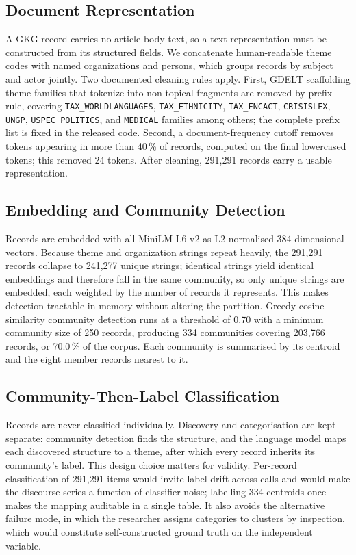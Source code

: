 \documentclass[conference]{IEEEtran}
\begin{document}
\subsection{Document Representation}
A GKG record carries no article body text, so a text representation must be
constructed from its structured fields. We concatenate human-readable theme
codes with named organizations and persons, which groups records by subject
and actor jointly. Two documented cleaning rules apply. First, GDELT
scaffolding theme families that tokenize into non-topical fragments are removed
by prefix rule, covering \texttt{TAX\_WORLDLANGUAGES}, \texttt{TAX\_ETHNICITY},
\texttt{TAX\_FNCACT}, \texttt{CRISISLEX}, \texttt{UNGP},
\texttt{USPEC\_POLITICS}, and \texttt{MEDICAL} families among others; the
complete prefix list is fixed in the released code.
Second, a document-frequency cutoff removes tokens appearing in more than
40\,\% of records, computed on the final lowercased tokens; this removed 24
tokens. After cleaning, 291{,}291 records carry a usable representation.

\subsection{Embedding and Community Detection}
Records are embedded with all-MiniLM-L6-v2 \cite{reimers2019} as L2-normalised
384-dimensional vectors. Because theme and organization strings repeat heavily,
the 291{,}291 records collapse to 241{,}277 unique strings; identical strings
yield identical embeddings and therefore fall in the same community, so only
unique strings are embedded, each weighted by the number of records it
represents. This makes detection tractable in memory without altering the
partition. Greedy cosine-similarity community detection runs at a threshold of
0.70 with a minimum community size of 250 records, producing 334 communities
covering 203{,}766 records, or 70.0\,\% of the corpus. Each community is
summarised by its centroid and the eight member records nearest to it.

\subsection{Community-Then-Label Classification}
Records are never classified individually. Discovery and categorisation are kept
separate: community detection finds the structure, and the language model maps
each discovered structure to a theme, after which every record inherits its
community's label. This design choice matters for validity. Per-record
classification of 291{,}291 items would invite label drift across calls and
would make the discourse series a function of classifier noise; labelling 334
centroids once makes the mapping auditable in a single table. It also avoids the
alternative failure mode, in which the researcher assigns categories to clusters
by inspection, which would constitute self-constructed ground truth on the
independent variable.
\end{document}
